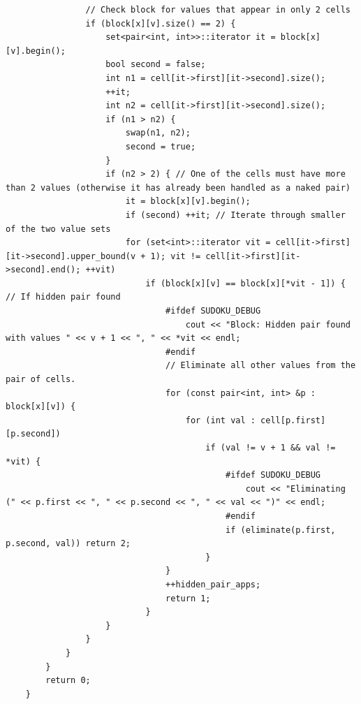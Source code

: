 \documentclass{article}
\begin{document}
\begin{lstlisting}
                // Check block for values that appear in only 2 cells
                if (block[x][v].size() == 2) {
                    set<pair<int, int>>::iterator it = block[x][v].begin();
                    bool second = false;
                    int n1 = cell[it->first][it->second].size();
                    ++it;
                    int n2 = cell[it->first][it->second].size();
                    if (n1 > n2) {
                        swap(n1, n2);
                        second = true;
                    }
                    if (n2 > 2) { // One of the cells must have more than 2 values (otherwise it has already been handled as a naked pair)
                        it = block[x][v].begin();
                        if (second) ++it; // Iterate through smaller of the two value sets
                        for (set<int>::iterator vit = cell[it->first][it->second].upper_bound(v + 1); vit != cell[it->first][it->second].end(); ++vit)
                            if (block[x][v] == block[x][*vit - 1]) { // If hidden pair found
                                #ifdef SUDOKU_DEBUG
                                    cout << "Block: Hidden pair found with values " << v + 1 << ", " << *vit << endl;
                                #endif
                                // Eliminate all other values from the pair of cells.
                                for (const pair<int, int> &p : block[x][v]) {
                                    for (int val : cell[p.first][p.second])
                                        if (val != v + 1 && val != *vit) {
                                            #ifdef SUDOKU_DEBUG
                                                cout << "Eliminating (" << p.first << ", " << p.second << ", " << val << ")" << endl;
                                            #endif
                                            if (eliminate(p.first, p.second, val)) return 2;
                                        }
                                }
                                ++hidden_pair_apps;
                                return 1;
                            }
                    }
                }
            }
        }
        return 0;
    }


\end{lstlisting}
\end{document}
